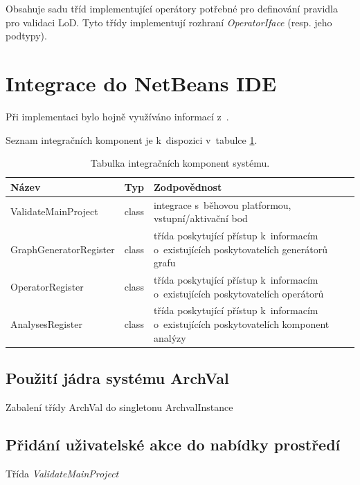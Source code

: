 Obsahuje sadu tříd implementující operátory potřebné pro definování pravidla pro validaci LoD. Tyto třídy implementují rozhraní \emph{OperatorIface} (resp. jeho podtypy).

\section{Integrace do NetBeans IDE}


Při implementaci bylo hojně využíváno informací z~\cite{netbeans_platform}.

Seznam integračních komponent je k~dispozici v~tabulce \ref{implementation-integration_components}.

\begin{table}
  \caption{Tabulka integračních komponent systému. \label{implementation-integration_components}}
  \begin{center}
    \begin{tabular}{ | l | l | p{8cm} | }
      \hline
      \textbf{Název} & \textbf{Typ} & \textbf{Zodpovědnost} \\
      \hline
      \hline
      ValidateMainProject & class & integrace s~běhovou platformou, vstupní/aktivační bod \\ \hline
      GraphGeneratorRegister & class & třída poskytující přístup k~informacím o~existujících poskytovatelích generátorů grafu \\ \hline
      OperatorRegister & class & třída poskytující přístup k~informacím o~existujících poskytovatelích operátorů \\ \hline
      AnalysesRegister & class & třída poskytující přístup k~informacím o~existujících poskytovatelích komponent analýzy \\ \hline
    \end{tabular}
  \end{center}
\end{table}

\subsection{Použití jádra systému ArchVal}
Zabalení třídy ArchVal do singletonu ArchvalInstance

\subsection{Přidání uživatelské akce do nabídky prostředí}
Třída \emph{ValidateMainProject}

